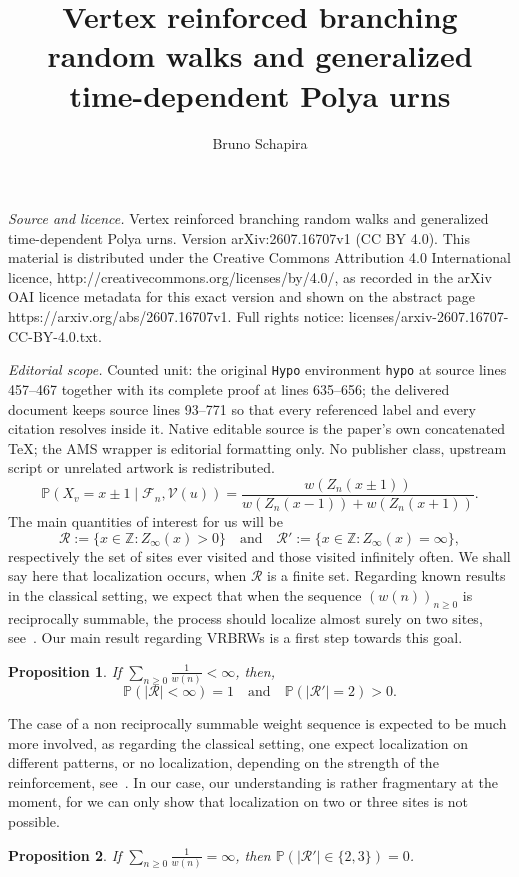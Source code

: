 \documentclass[10pt,a4paper]{amsart}
\newtheorem {prop} {Proposition} [section]
\newcommand{\1}{{\text{\Large $\mathfrak 1$}}}
\begin{document}
\title[Vertex reinforced branching random walks and generalized tim]{Vertex reinforced branching random walks and generalized time-dependent Polya urns}
\author{Bruno Schapira}
\date{}
\maketitle
\noindent\emph{Source and licence.} Vertex reinforced branching random walks and generalized time-dependent Polya urns. Version arXiv:2607.16707v1 (CC BY 4.0). This material is distributed under the Creative Commons Attribution 4.0 International licence, http://creativecommons.org/licenses/by/4.0/, as recorded in the arXiv OAI licence metadata for this exact version and shown on the abstract page https://arxiv.org/abs/2607.16707v1. Full rights notice: licenses/arxiv-2607.16707-CC-BY-4.0.txt.\par\smallskip
\noindent\textit{Editorial scope.} Counted unit: the original \texttt{Hypo} environment \texttt{hypo} at source lines 457--467 together with its complete proof at lines 635--656; the delivered document keeps source lines 93--771 so that every referenced label and every citation resolves inside it. Native editable source is the paper's own concatenated TeX; the AMS wrapper is editorial formatting only. No publisher class, upstream script or unrelated artwork is redistributed.
\begin{equation}\label{def.process}
\mathbb P(X_v = x\pm 1 \mid  \mathcal F_n, \mathcal V(u)) = \frac{w(Z_n(x\pm 1))}{w(Z_n(x-1)) + w(Z_n(x+1))}.
\end{equation}
The main quantities of interest for us will be  
$$\mathcal R:= \{x \in \mathbb Z : Z_\infty(x) >0\} \quad \text{and}\quad \mathcal R':=\{x\in \mathbb Z : Z_\infty(x) = \infty\},$$
respectively the set of sites ever visited and those visited infinitely often. We shall say here that localization occurs, when $\mathcal R$ is a finite set. Regarding known results in the classical setting, we expect that when the sequence $(w(n))_{n\ge 0}$ is reciprocally summable, the process should localize almost surely on two sites, see~\cite{V,BSS}. Our main result regarding VRBRWs is a first step towards this goal.   

\begin{prop} \label{prop.strong}
If $\sum_{n\ge 0} \tfrac 1{w(n)}<\infty$, then, 
$$\mathbb P(|\mathcal R|<\infty) = 1 \quad \text{and}\quad \mathbb P(|\mathcal R'|=2)>0.$$ 
\end{prop}


The case of a non reciprocally summable weight sequence is expected to be much more involved, as regarding the classical setting, one expect localization on different patterns, or no localization, depending on the strength of the reinforcement, see~\cite{BSS,BSS2,CK,Sch12,Sch21,S,T1,V}. In our case, our understanding is rather fragmentary at the moment,  for we can only show that localization on two or three sites is not possible.  
\begin{prop}\label{prop.3sites}
If $\sum_{n\ge 0} \tfrac 1{w(n)}=\infty$, then $\mathbb P(|\mathcal R'|\in \{2,3\})=0$. 
\end{prop}
\end{document}
